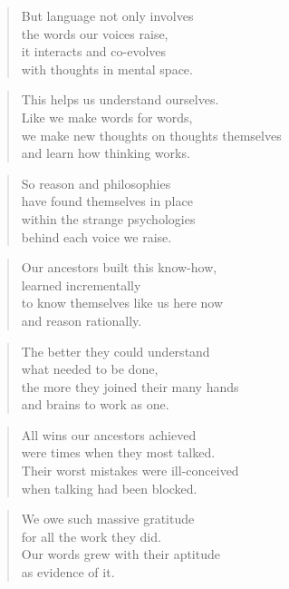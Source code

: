 \documentclass[14pt,a4paper]{article}
\begin{document}
\begin{verse}
But language not only involves\\
the words our voices raise,\\
it interacts and co-evolves\\
with thoughts in mental space.
\end{verse}

\begin{verse}
This helps us understand ourselves.\\
Like we make words for words,\\
we make new thoughts on thoughts themselves\\
and learn how thinking works.
\end{verse}

\begin{verse}
So reason and philosophies\\
have found themselves in place\\
within the strange psychologies\\
behind each voice we raise.
\end{verse}

\begin{verse}
Our ancestors built this know-how,\\
learned incrementally\\
to know themselves like us here now\\
and reason rationally.
\end{verse}

\begin{verse}
The better they could understand\\
what needed to be done,\\
the more they joined their many hands\\
and brains to work as one.
\end{verse}

\begin{verse}
All wins our ancestors achieved\\
were times when they most talked.\\
Their worst mistakes were ill-conceived\\
when talking had been blocked.
\end{verse}

\begin{verse}
We owe such massive gratitude\\
for all the work they did.\\
Our words grew with their aptitude\\
as evidence of it.
\end{verse}
\end{document}
